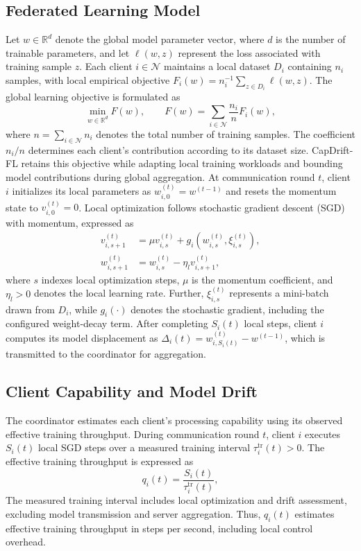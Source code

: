 \documentclass[conference]{IEEEtran}
\begin{document}
\subsection{Federated Learning Model}
\label{subsec:learning}
Let $w\in\mathbb{R}^d$ denote the global
model parameter vector, where $d$ is the
number of trainable parameters, and let
$\ell(w,z)$ represent the loss associated with training sample $z$. Each client $i\in\mathcal{N}$ maintains a local dataset $D_i$ containing
$n_i$ samples, with local empirical objective
$F_i(w)=n_i^{-1}\sum_{z\in D_i}\ell(w,z)$.
The global learning objective is formulated as
\begin{equation}
\min_{w\in\mathbb{R}^d}
F(w), \qquad
F(w)=\sum_{i\in\mathcal{N}}
\frac{n_i}{n}F_i(w),
\label{eq:objective}
\end{equation}
where $n=\sum_{i\in\mathcal{N}}n_i$
denotes the total number of training samples. The coefficient $n_i/n$
determines each client's contribution according to its dataset size.
CapDrift-FL retains this objective while adapting local training workloads and bounding model contributions during global aggregation.
At communication round $t$, client $i$
initializes its local parameters as
$w_{i,0}^{(t)}=w^{(t-1)}$ and resets the
momentum state to $v_{i,0}^{(t)}=0$.
Local optimization follows stochastic
gradient descent (SGD) with momentum,
expressed as
\begin{align}
v_{i,s+1}^{(t)}
&=\mu v_{i,s}^{(t)}
+g_i\!\left(w_{i,s}^{(t)},
\xi_{i,s}^{(t)}\right),
\label{eq:velocity}\\
w_{i,s+1}^{(t)}
&=w_{i,s}^{(t)}
-\eta_l v_{i,s+1}^{(t)},
\label{eq:localsgd}
\end{align}
where $s$ indexes local optimization steps, $\mu$ is the momentum coefficient, and $\eta_l>0$ denotes the local learning rate. Further, $\xi_{i,s}^{(t)}$ represents a mini-batch drawn from $D_i$, while $g_i(\cdot)$ denotes the stochastic gradient, including the configured weight-decay term. After completing
$S_i(t)$ local steps, client $i$
computes its model displacement as $\Delta_i(t)=w_{i,S_i(t)}^{(t)}
-w^{(t-1)}$, which is transmitted
to the coordinator for aggregation.

\subsection{Client Capability and Model Drift}
\label{subsec:state}
The coordinator estimates each client's processing capability using its observed effective training throughput. During communication round $t$, client $i$ executes $S_i(t)$ local SGD steps over a measured training interval
$\tau_i^{\mathrm{tr}}(t)>0$. The effective training throughput is expressed as
\begin{equation}
q_i(t)=
\frac{S_i(t)}{\tau_i^{\mathrm{tr}}(t)},
\label{eq:throughput}
\end{equation}
The measured training interval includes local optimization and drift assessment, excluding model transmission and server aggregation. Thus, $q_i(t)$ estimates effective training throughput in steps per second, including local control overhead.
\end{document}
